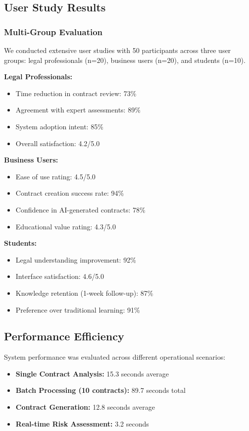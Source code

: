 \subsection{User Study Results}

\subsubsection{Multi-Group Evaluation}

We conducted extensive user studies with 50 participants across three user groups: legal professionals (n=20), business users (n=20), and students (n=10).

\textbf{Legal Professionals:}
\begin{itemize}
    \item Time reduction in contract review: 73\%
    \item Agreement with expert assessments: 89\%
    \item System adoption intent: 85\%
    \item Overall satisfaction: 4.2/5.0
\end{itemize}

\textbf{Business Users:}
\begin{itemize}
    \item Ease of use rating: 4.5/5.0
    \item Contract creation success rate: 94\%
    \item Confidence in AI-generated contracts: 78\%
    \item Educational value rating: 4.3/5.0
\end{itemize}

\textbf{Students:}
\begin{itemize}
    \item Legal understanding improvement: 92\%
    \item Interface satisfaction: 4.6/5.0
    \item Knowledge retention (1-week follow-up): 87\%
    \item Preference over traditional learning: 91\%
\end{itemize}

\subsection{Performance Efficiency}

System performance was evaluated across different operational scenarios:

\begin{itemize}
    \item \textbf{Single Contract Analysis:} 15.3 seconds average
    \item \textbf{Batch Processing (10 contracts):} 89.7 seconds total
    \item \textbf{Contract Generation:} 12.8 seconds average
    \item \textbf{Real-time Risk Assessment:} 3.2 seconds
\end{itemize}

